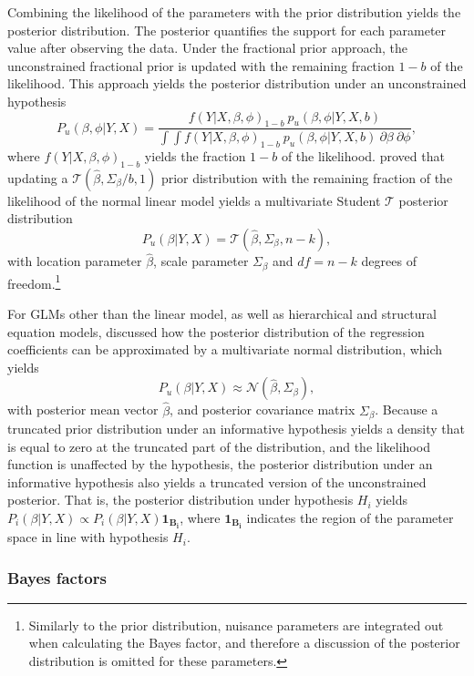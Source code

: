 \documentclass[review, 3p, authoryear]{elsarticle} %
\begin{document}
Combining the likelihood of the parameters with the prior distribution yields the posterior distribution.
The posterior quantifies the support for each parameter value after observing the data.
Under the fractional prior approach, the unconstrained fractional prior is updated with the remaining fraction \(1-b\) of the likelihood.
This approach yields the posterior distribution under an unconstrained hypothesis
\[
P_u(\beta, \phi | Y, X) = 
\frac{
f(Y | X, \beta, \phi)_{1-b} ~ p_u(\beta, \phi | Y, X, b)
}{
\int \int f(Y | X, \beta, \phi)_{1-b} ~ p_u(\beta, \phi | Y, X, b) ~ \partial \beta ~ \partial \phi
},
\]
where \(f(Y | X, \beta, \phi)_{1-b}\) yields the fraction \(1-b\) of the likelihood.
\citet{mulder_olssoncollentine_2019} proved that updating a \(\mathcal{T}(\hat{\beta}, \Sigma_\beta / b, 1)\) prior distribution with the remaining fraction of the likelihood of the normal linear model yields a multivariate Student \(\mathcal{T}\) posterior distribution
\[
P_u(\beta | Y, X) = \mathcal{T}(\hat{\beta}, \Sigma_\beta, n - k),
\]
with location parameter \(\hat{\beta}\), scale parameter \(\Sigma_{\beta}\) and \(df = n - k\) degrees of freedom.\footnote{Similarly to the prior distribution, nuisance parameters are integrated out when calculating the Bayes factor, and therefore a discussion of the posterior distribution is omitted for these parameters.}

For GLMs other than the linear model, as well as hierarchical and structural equation models, \citet{gu_approximated_2018} discussed how the posterior distribution of the regression coefficients can be approximated by a multivariate normal distribution, which yields
\[
P_u(\beta | Y, X) \approx \mathcal{N}(\hat{\beta}, \Sigma_\beta),
\]
with posterior mean vector \(\hat{\beta}\), and posterior covariance matrix \(\Sigma_\beta\).
Because a truncated prior distribution under an informative hypothesis yields a density that is equal to zero at the truncated part of the distribution, and the likelihood function is unaffected by the hypothesis, the posterior distribution under an informative hypothesis also yields a truncated version of the unconstrained posterior.
That is, the posterior distribution under hypothesis \(H_i\) yields
\(P_i(\beta | Y, X) \propto P_i(\beta | Y, X)\boldsymbol{1}_{\boldsymbol{B_i}}\), where \(\boldsymbol{1}_{\boldsymbol{B_i}}\) indicates the region of the parameter space in line with hypothesis \(H_i\).

\hypertarget{bayes-factors}{%
\subsubsection{Bayes factors}\label{bayes-factors}}
\end{document}
